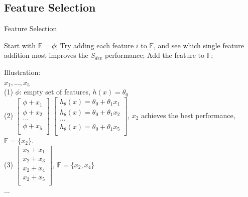 \documentclass{article}
\begin{document}
\subsection{Feature Selection}
\begin{algorithm}[h]
  \caption{Feature Selection}
\label{alg::conjugateGradient}
\begin{algorithmic}[1]
\State Start with $\mathbb{F} = \phi$;
  \State Try adding each feature $i$ to $\mathbb{F}$, and see which single feature addition most improves the $S_{dev}$ performance;
  \State Add the feature to $\mathbb{F}$;
\EndFor
\end{algorithmic}
\end{algorithm}
\noindent
Illustration:\\
$x_1, ..., x_5$\\
(1) $\phi$: empty set of features, $h(x) = \theta_0$\\
(2) $\begin{bmatrix}
  \phi + x_1\\
  \phi + x_2\\
  ...\\
  \phi + x_5\\
  \end{bmatrix}$ $\begin{bmatrix}
    h_\theta(x) = \theta_0 + \theta_1x_1\\
    h_\theta(x) = \theta_0 + \theta_1x_2\\
    ...\\
    h_\theta(x) = \theta_0 + \theta_1x_5\\
    \end{bmatrix}$, $x_2$ achieves the best performance, $\mathbb{F} = \{x_2\}$.\\
(3) $\begin{bmatrix}
  x_2 + x_1\\
  x_2 + x_3\\
  x_2 + x_4\\
  x_2 + x_5\\
  \end{bmatrix}$, $\mathbb{F} = \{x_2, x_4\}$\\
...\\
\end{document}
